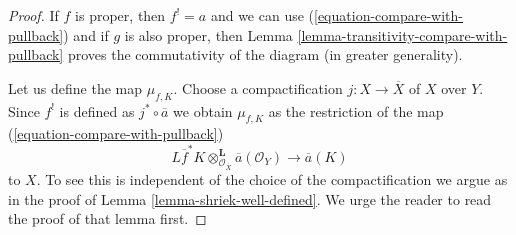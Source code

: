 \begin{proof}
If $f$ is proper, then $f^! = a$ and we can use
(\ref{equation-compare-with-pullback}) and if $g$ is also proper,
then Lemma \ref{lemma-transitivity-compare-with-pullback} proves
the commutativity of the diagram (in greater generality).

\medskip\noindent
Let us define the map $\mu_{f, K}$. Choose a compactification
$j : X \to \overline{X}$ of $X$ over $Y$. Since $f^!$ is defined
as $j^* \circ \overline{a}$ we obtain $\mu_{f, K}$ as the restriction
of the map (\ref{equation-compare-with-pullback})
$$
L\overline{f}^*K \otimes_{\mathcal{O}_{\overline{X}}}^\mathbf{L}
\overline{a}(\mathcal{O}_Y)
\longrightarrow
\overline{a}(K)
$$
to $X$. To see this is independent of the choice of the compactification
we argue as in the proof of Lemma \ref{lemma-shriek-well-defined}.
We urge the reader to read the proof of that lemma first.


\end{proof}
